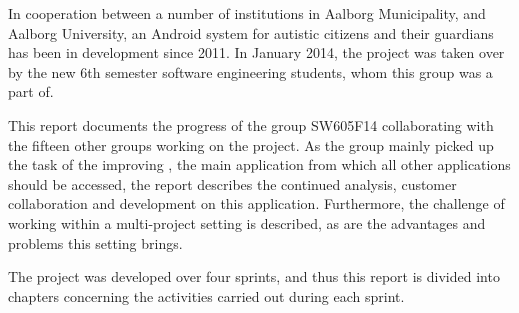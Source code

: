 In cooperation between a number of institutions in Aalborg Municipality, and Aalborg University, an Android system for autistic citizens and their guardians has been in development since 2011.
In January 2014, the project was taken over by the new 6th semester software engineering students, whom this group was a part of.

This report documents the progress of the group SW605F14 collaborating with the fifteen other groups working on the project.
As the group mainly picked up the task of the improving \launcher, the main application from which all other applications should be accessed, the report describes the continued analysis, customer collaboration and development on this application.
Furthermore, the challenge of working within a multi-project setting is described, as are the advantages and problems this setting brings.

The project was developed over four sprints, and thus this report is divided into chapters concerning the activities carried out during each sprint.